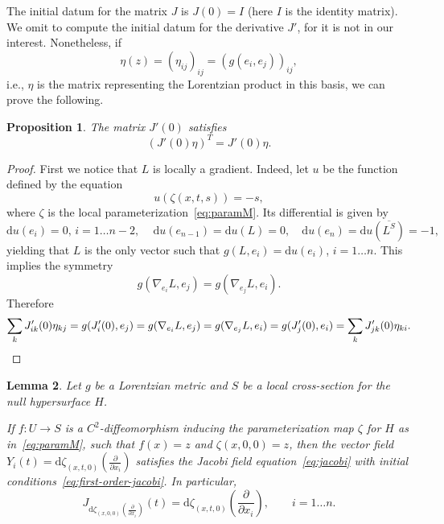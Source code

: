 \documentclass[12pt,a4paper]{amsart}
\theoremstyle{plain}
\newtheorem{lemma}{Lemma}[section]
\newtheorem{proposition}[lemma]{Proposition}
\theoremstyle{definition}
\numberwithin{equation}{section}
\newcommand{\de}{{\mathrm{d}}}
\newcommand{\lparam}{\zeta}
\begin{document}
The initial datum for the matrix $J$ is $J(0)=I$ (here $I$ is the
identity matrix).
%
We omit to compute the initial datum for the derivative $J'$, for it
is not in our interest. 
Nonetheless, if 
\begin{equation}\label{eq:def-eta}
\eta(z) =(\eta_{ij})_{ij} = (g(e_i,e_j))_{ij},
\end{equation}
i.e., $\eta$ is the matrix representing the Lorentzian product in this basis,  we can prove the following.
%
\begin{proposition}
  The matrix $J'(0)$ satisfies
\begin{equation*}
  (J'(0)\eta)^T
  = J'(0)\eta.
\end{equation*}
\end{proposition}
%
\begin{proof}
First we notice that $L$ is locally a gradient.
%
Indeed, let $u$ be the function defined by the equation
\begin{equation*}
  u(\lparam(x,t,s))=-s,
\end{equation*}
where $\lparam$ is the local parameterization~\eqref{eq:paramM}.
%
Its differential is given by
\begin{equation*}
  \de u(e_i)=0,\,
  i=1\dots n-2
  ,\,
  \quad
  \de u(e_{n-1})=
  \de u(L)
  =0
  ,
  \quad
  \de u(e_{n})
  =
  \de u(\overline{L^S})
  =-1,
  \end{equation*}
yielding that $L$ is the only vector such that $g(L,e_i)=\de u(e_i)$,
$i=1\dots n$.
%
This implies the  symmetry 
$$g(\nabla_{e_i} L,
e_j)=g(\nabla_{e_j} L, e_i).$$
%
Therefore
\begin{equation*}
  \sum_k J_{ik}'(0) \eta_{kj}
  =
  g(J_i'(0),e_j)
  =
  g(\nabla_{e_i} L,
  e_j)
  =
  g(\nabla_{e_j} L,
  e_i)
  =
  g(J_j'(0),e_i)
  =
  \sum_k J_{jk}'(0) \eta_{ki}.
  \qedhere
\end{equation*}
\end{proof}






\begin{lemma}\label{lem:Jdzeta}
Let $g$ be a Lorentzian metric and $S$ be a local cross-section for the null hypersurface $H$.

If $f:U\to S$ is a $C^2$-diffeomorphism inducing
the parameterization map $\lparam$ for $H$ as in~\eqref{eq:paramM}, such that $f(x)=z$ and $\lparam(x,0,0) = z$, then the vector field $Y_i(t)= \de\lparam_{(x,t,0)}
  \left(\frac{\partial}{\partial x_i}\right)$ satisfies the Jacobi field equation~\eqref{eq:jacobi} with initial conditions~\eqref{eq:first-order-jacobi}. In particular, 
\begin{equation}\label{E:Jacobi}
  J_{\de\lparam_{(x,0,0)}(\frac{\partial}{\partial x_i})}
  (t)
  =
  \de\lparam_{(x,t,0)}
  \left(\frac{\partial}{\partial x_i}\right),
  \qquad
  i=1\dots n.
\end{equation}
\end{lemma}
\end{document}
